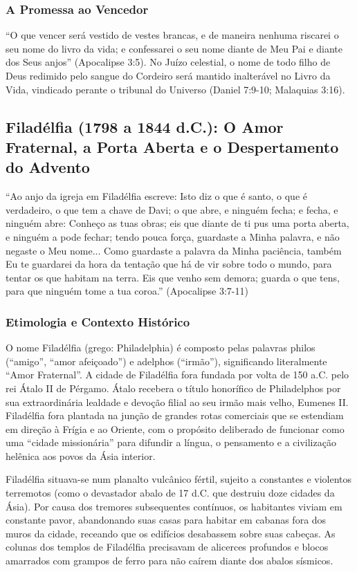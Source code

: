 \subsubsection*{A Promessa ao Vencedor}
``O que vencer será vestido de vestes brancas, e de maneira nenhuma riscarei o seu nome do livro da vida; e confessarei o seu nome diante de Meu Pai e diante dos Seus anjos'' (Apocalipse 3:5). No Juízo celestial, o nome de todo filho de Deus redimido pelo sangue do Cordeiro será mantido inalterável no Livro da Vida, vindicado perante o tribunal do Universo (Daniel 7:9-10; Malaquias 3:16).



\subsection{Filadélfia (1798 a 1844 d.C.): O Amor Fraternal, a Porta Aberta e o Despertamento do Advento}


``Ao anjo da igreja em Filadélfia escreve: Isto diz o que é santo, o que é verdadeiro, o que tem a chave de Davi; o que abre, e ninguém fecha; e fecha, e ninguém abre: Conheço as tuas obras; eis que diante de ti pus uma porta aberta, e ninguém a pode fechar; tendo pouca força, guardaste a Minha palavra, e não negaste o Meu nome... Como guardaste a palavra da Minha paciência, também Eu te guardarei da hora da tentação que há de vir sobre todo o mundo, para tentar os que habitam na terra. Eis que venho sem demora; guarda o que tens, para que ninguém tome a tua coroa.'' (Apocalipse 3:7-11)


\subsubsection*{Etimologia e Contexto Histórico}
O nome Filadélfia (grego: Philadelphia) é composto pelas palavras philos (``amigo'', ``amor afeiçoado'') e adelphos (``irmão''), significando literalmente ``Amor Fraternal''. A cidade de Filadélfia fora fundada por volta de 150 a.C. pelo rei Átalo II de Pérgamo. Átalo recebera o título honorífico de Philadelphos por sua extraordinária lealdade e devoção filial ao seu irmão mais velho, Eumenes II. Filadélfia fora plantada na junção de grandes rotas comerciais que se estendiam em direção à Frígia e ao Oriente, com o propósito deliberado de funcionar como uma ``cidade missionária'' para difundir a língua, o pensamento e a civilização helênica aos povos da Ásia interior.

Filadélfia situava-se num planalto vulcânico fértil, sujeito a constantes e violentos terremotos (como o devastador abalo de 17 d.C. que destruiu doze cidades da Ásia). Por causa dos tremores subsequentes contínuos, os habitantes viviam em constante pavor, abandonando suas casas para habitar em cabanas fora dos muros da cidade, receando que os edifícios desabassem sobre suas cabeças. As colunas dos templos de Filadélfia precisavam de alicerces profundos e blocos amarrados com grampos de ferro para não caírem diante dos abalos sísmicos.


